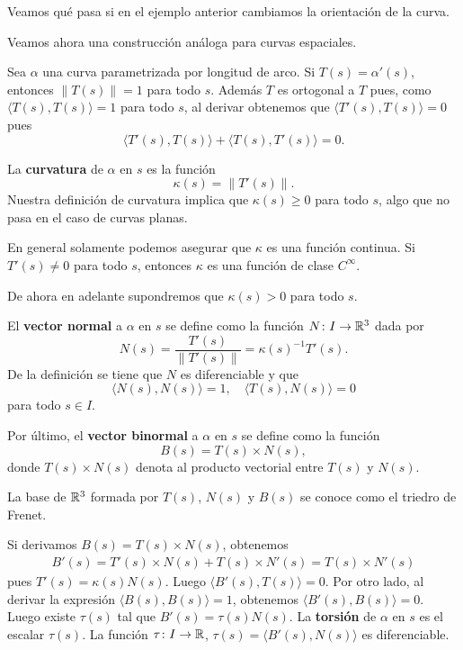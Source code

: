 Veamos qué pasa si en el ejemplo anterior cambiamos la orientación de la curva. 


Veamos ahora una construcción análoga para curvas espaciales. 

Sea $\alpha$ una curva parametrizada por longitud de arco. Si
$T(s)=\alpha'(s)$, entonces $\|T(s)\|=1$ para todo $s$. Además $T$ es ortogonal a
$T$ pues, como $\langle T(s),T(s)\rangle=1$ para todo $s$, al derivar obtenemos
que $\langle T'(s),T(s)\rangle=0$ pues
\[
	\langle T'(s),T(s)\rangle+\langle T(s),T'(s)\rangle=0.
\]

La \textbf{curvatura} de $\alpha$ en $s$ es 
la función 
\[
\kappa(s)=\|T'(s)\|.
\]
Nuestra definición de curvatura implica que $\kappa(s)\geq0$ para todo $s$,
algo que no pasa en el caso de curvas planas. 

En general solamente podemos asegurar que $\kappa$ es una función continua. Si
$T'(s)\ne 0$ para todo $s$, entonces $\kappa$ es una función de clase
$C^{\infty}$. 

De ahora en adelante supondremos que $\kappa(s)>0$ para todo $s$. 

El \textbf{vector normal} a $\alpha$ en $s$ se define como la función $N\colon I\to\mathbb{R}^3$ dada por 
\[
N(s)=\frac{T'(s)}{\|T'(s)\|}=\kappa(s)^{-1}T'(s).
\]
De la definición se tiene que $N$ es diferenciable y que 
\[
	\langle N(s),N(s)\rangle=1,\quad
	\langle T(s),N(s)\rangle=0
\]
para todo $s\in I$.

Por último, el \textbf{vector binormal} a $\alpha$ en $s$ se define como la
función
\[
	B(s)=T(s)\times N(s),
\]
donde $T(s)\times N(s)$ denota al producto vectorial entre $T(s)$ y $N(s)$. 

\begin{definition}
	La base de $\mathbb{R}^3$ formada por $T(s)$, $N(s)$ y $B(s)$ se conoce como el triedro de Frenet.
\end{definition}

Si derivamos $B(s)=T(s)\times N(s)$, obtenemos
\begin{align*}
	B'(s)=T'(s)\times N(s)+T(s)\times N'(s)=T(s)\times N'(s)
\end{align*}
pues $T'(s)=\kappa(s)N(s)$. Luego $\langle B'(s),T(s)\rangle=0$. Por otro lado,
al derivar la expresión $\langle B(s),B(s)\rangle=1$, obtenemos $\langle
B'(s),B(s)\rangle=0$. Luego existe $\tau(s)$ tal que $B'(s)=\tau(s)N(s)$. La
\textbf{torsión} de $\alpha$ en $s$ es el escalar $\tau(s)$. La función
$\tau\colon I\to\mathbb{R}$, $\tau(s)=\langle B'(s),N(s)\rangle$ es diferenciable.

